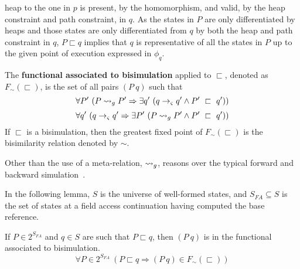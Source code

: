 heap to the one in $p$ is present, by the homomorphism, and valid, by
the heap constraint and path constraint, in $q$. As the states in $P$
are only differentiated by heaps and those states are only
differentiated from $q$ by both the heap and path constraint in $q$,
$P \sqsubset q$ implies that $q$ is representative of all the states
in $P$ up to the given point of execution expressed in $\phi_q$.
\begin{definition}
\label{bisimulation}
The \textbf{functional associated to bisimulation} applied to $\sqsubset$, denoted as $F_\sim(\sqsubset)$, is the set of all pairs
$(P\ q)$ such that
\begin{equation}
\label{eqn:BisimulationForwards}
\forall P^\prime\ ( P \leadsto_{g} P^\prime \Rightarrow \exists q^\prime\ ( q \rightarrow_{\varsigma} q^\prime \wedge P^\prime\ \sqsubset\ q^\prime))
\end{equation}
\begin{equation}
\label{eqn:BisimulationBackwards}
\forall q^\prime\ ( q \rightarrow_{\varsigma} q^\prime\Rightarrow \exists P^\prime\ ( P \leadsto_{g} P^\prime \wedge P^\prime\ \sqsubset\ q^\prime))
\end{equation}
If $\sqsubset$ is a bisimulation, then the greatest fixed point of $F_\sim(\sqsubset)$ is the bisimilarity relation denoted by $\sim$.
\end{definition}
Other than the use of a meta-relation, $\leadsto_{g}$,  reasons over the typical forward and backward
simulation~\cite{Sangiorgi:2011}.

In the following lemma, $S$ is the universe of well-formed states, and $S_{FA} \subseteq S$ is the set of states at a field access continuation having computed the base reference.
\begin{lemma}
If $P \in 2^{S_\mathit{FA}}$ and $q \in S$ are such that $P \sqsubset q$, then $(P\ q)$ is in the functional associated to bisimulation.
\label{lem:access}
$$
\forall P \in 2^{S_\mathit{FA}}\ (P \sqsubset q \Rightarrow (P\ q) \in F_\sim(\sqsubset))
$$
\end{lemma}

